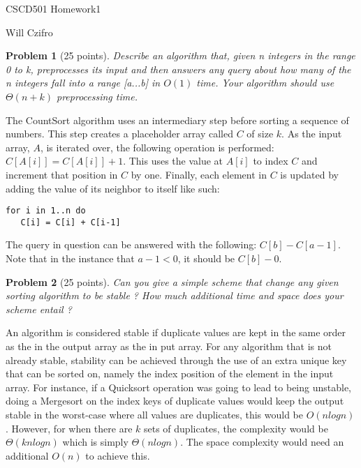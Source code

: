 \documentclass[11pt]{article}
\newtheorem{problem}{Problem}
\begin{document}
\begin{center}
  {\LARGE CSCD501 Homework1}

\bigskip 

{\Large Will Czifro}

\end{center}

\bigskip 

\begin{problem}[25 points]
\label{prob:1}
 Describe an algorithm that, given n integers in the range 0 to k, preprocesses its input and
then answers any query about how many of the n integers fall into a range [a...b] in $O(1)$ time. Your algorithm should use $\Theta(n + k)$ preprocessing time.
\end{problem}

The CountSort algorithm uses an intermediary step before sorting a sequence of numbers. This step creates a placeholder array called $C$ of size $k$. As the input array, $A$, is iterated over, the following operation is performed: $C[A[i]] = C[A[i]] + 1$. This uses the value at $A[i]$ to index $C$ and increment that position in $C$ by one. Finally, each element in $C$ is updated by adding the value of its neighbor to itself like such:

\begin{lstlisting}
for i in 1..n do
   C[i] = C[i] + C[i-1]
\end{lstlisting}

The query in question can be answered with the following: $C[b] - C[a-1]$. Note that in the instance that $a-1 < 0$, it should be $C[b] - 0$.


\begin{problem}[25 points]
\label{prob:2}
  Can you give a simple scheme that change any given sorting algorithm to be stable ? How
much additional time and space does your scheme entail ?
\end{problem}

An algorithm is considered stable if duplicate values are kept in the same order as the in the output array as the in put array. For any algorithm that is not already stable, stability can be achieved through the use of an extra unique key that can be sorted on, namely the index position of the element in the input array. For instance, if a Quicksort operation was going to lead to being unstable, doing a Mergesort on the index keys of duplicate values would keep the output stable in the worst-case where all values are duplicates, this would be $O(nlogn)$. However, for when there are $k$ sets of duplicates, the complexity would be $\Theta(knlogn)$ which is simply $\Theta(nlogn)$. The space complexity would need an additional $O(n)$ to achieve this.
\end{document}
